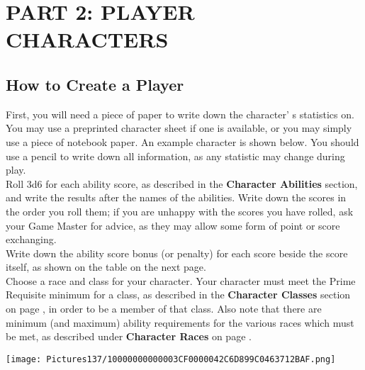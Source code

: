 \documentclass[a4paper,twoside,openany,10pt]{book}
\begin{document}
\pagebreak

\section{PART 2: PLAYER CHARACTERS}\label{part-2-player-characters}

\begin{multicols}{2}

\subsection{How to Create a Player}

\label{how-to-create-a-player-character}

First, you will need a piece of paper to write down the character' s statistics on. You may use a preprinted character sheet if one is available, or you may simply use a piece of notebook paper. An example character is shown below. You should use a pencil to write down all information, as any statistic may change during play.\\

Roll 3d6 for each ability score, as described in the \textbf{Character Abilities} section, and write the results after the names of the abilities. Write down the scores in the order you roll them; if you are unhappy with the scores you have rolled, ask your Game Master for advice, as they may allow some form of point or score exchanging.\\

Write down the ability score bonus (or penalty) for each score beside the score itself, as shown on the table on the next page.\\

Choose a race and class for your character. Your character must meet the Prime Requisite minimum for a class, as described in the \textbf{Character Classes} section on page \hyperlink{character-classes}{\pageref{character-classes}}, in order to be a member of that class. Also note that there are minimum (and maximum) ability requirements for the various races which must be met, as described under \textbf{Character Races} on page \hyperlink{character-races}{\pageref{character-races}}.\\

\begin{flushleft}
	\texttt{[image: Pictures137/10000000000003CF0000042C6D899C0463712BAF.png]}
\end{flushleft}\medskip


\end{multicols}
\end{document}
